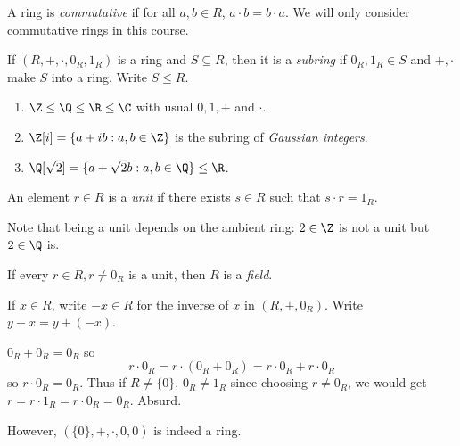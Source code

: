 \documentclass[a4paper]{article}
\theoremstyle{definition}
\begin{document}
A ring is \emph{commutative} if for all \(a, b\in R\), \(a \cdot b = b \cdot a\). We will only consider commutative rings in this course.

\begin{definition}[Subring]
  If \((R, +, \cdot, 0_R, 1_R)\) is a ring and \(S \subseteq R\), then it is a \emph{subring} if \(0_R, 1_R \in S\) and \(+, \cdot\) make \(S\) into a ring. Write \(S \leq R\).
\end{definition}

\begin{eg}\leavevmode
  \begin{enumerate}
  \item \(\Z \leq \Q \leq \R \leq \C\) with usual \(0, 1, +\) and \(\cdot\).
  \item \(\Z[i] = \{a + ib: a, b \in \Z\}\) is the subring of \emph{Gaussian integers}.
  \item \(\Q[\sqrt 2] = \{a + \sqrt 2 b: a, b \in \Q\} \leq \R\).
  \end{enumerate}
\end{eg}

\begin{definition}[Unit]
  An element \(r \in R\) is a \emph{unit} if there exists \(s \in R\) such that \(s \cdot r = 1_R\).
\end{definition}

Note that being a unit depends on the ambient ring: \(2 \in \Z\) is not a unit but \(2 \in \Q\) is.

If every \(r \in R, r \neq 0_R\) is a unit, then \(R\) is a \emph{field}.

\begin{notation}
  If \(x \in R\), write \(-x \in R\) for the inverse of \(x\) in \((R, +, 0_R)\). Write \(y - x = y + (-x)\).
\end{notation}

\begin{eg}
  \(0_R + 0_R = 0_R\) so
  \[
    r \cdot 0_R = r \cdot (0_R + 0_R) = r \cdot 0_R + r \cdot 0_R
  \]
  so \(r \cdot 0_R = 0_R\). Thus if \(R \neq \{0\}\), \(0_R \neq 1_R\) since choosing \(r \neq 0_R\), we would get \(r = r \cdot 1_R = r \cdot 0_R = 0_R\). Absurd.

  However, \((\{0\}, +, \cdot, 0, 0)\) is indeed a ring.
\end{eg}
\end{document}
